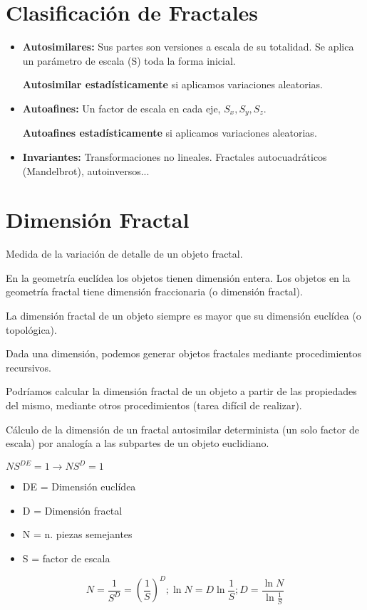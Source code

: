 \section{Clasificación de Fractales}
\begin{itemize}
    \item \textbf{Autosimilares:} Sus partes son versiones a escala de su totalidad. Se aplica un parámetro de escala (S) toda la forma inicial.
    
    \textbf{Autosimilar estadísticamente} si aplicamos variaciones aleatorias.
    \item \textbf{Autoafines:} Un factor de escala en cada eje, $S_x, S_y, S_z$.
    
    \textbf{Autoafines estadísticamente} si aplicamos variaciones aleatorias.
    \item \textbf{Invariantes:} Transformaciones no lineales. Fractales autocuadráticos (Mandelbrot), autoinversos...
\end{itemize}

\section{Dimensión Fractal}
Medida de la variación de detalle de un objeto fractal.

En la geometría euclídea los objetos tienen dimensión entera. Los objetos en la geometría fractal tiene dimensión fraccionaria (o dimensión fractal).

La dimensión fractal de un objeto siempre es mayor que su dimensión euclídea (o topológica).

Dada una dimensión, podemos generar objetos fractales mediante procedimientos recursivos.

Podríamos calcular la dimensión fractal de un objeto a partir de las propiedades del mismo, mediante otros procedimientos (tarea difícil de realizar).

Cálculo de la dimensión de un fractal autosimilar determinista (un solo factor de escala) por analogía a las subpartes de un objeto euclidiano.

$NS^{DE}=1 \rightarrow NS^{D}=1$
\begin{itemize}
    \item DE = Dimensión euclídea
    \item D = Dimensión fractal
    \item N = n. piezas semejantes
    \item S = factor de escala
\end{itemize}
$$N=\frac{1}{S^D}=\left(\frac{1}{S}\right)^D; \ln N = D \ln \frac{1}{S}; D = \frac{\ln N}{\ln \frac{1}{S}}$$

